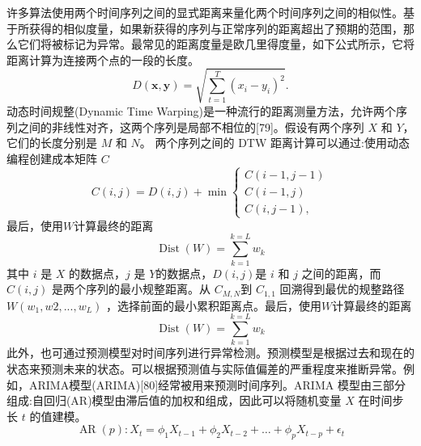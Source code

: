 许多算法使用两个时间序列之间的显式距离来量化两个时间序列之间的相似性。基于所获得的相似度量，如果新获得的序列与正常序列的距离超出了预期的范围，那么它们将被标记为异常。最常见的距离度量是欧几里得度量，如下公式所示，它将距离计算为连接两个点的一段的长度。
\begin{equation}
    D(\mathbf{x}, \mathbf{y})=\sqrt{\sum_{t=1}^T\left(x_i-y_i\right)^2} .
    \end{equation}
动态时间规整(Dynamic Time Warping)是一种流行的距离测量方法，允许两个序列之间的非线性对齐，这两个序列是局部不相位的[79]。假设有两个序列 $X$ 和 $Y$，它们的长度分别是 $M$ 和 $N$。   
两个序列之间的 DTW 距离计算可以通过:使用动态编程创建成本矩阵 $C$
    \begin{equation}
        C(i, j)=D(i, j)+\min \left\{\begin{array}{l}
        C(i-1, j-1) \\
        C(i-1, j) \\
        C(i, j-1),
        \end{array}\right.
        \end{equation}
    最后，使用$W$计算最终的距离
\begin{equation}
    \operatorname{Dist}(W)=\sum_{k=1}^{k=L} w_k
    \end{equation}
    其中 $i$ 是 $X$ 的数据点，$j$ 是 $Y$的数据点，$D(i, j)$是 $i$ 和 $j$ 之间的距离，而 $C(i, j)$ 是两个序列的最小规整距离。从 $C_{M, N}$到 $C_{1,1}$ 回溯得到最优的规整路径 $W(w_1, w2, ... , w_L)$ ，选择前面的最小累积距离点。最后，使用$W$计算最终的距离
    \begin{equation}
        \operatorname{Dist}(W)=\sum_{k=1}^{k=L} w_k
        \end{equation}
此外，也可通过预测模型对时间序列进行异常检测。预测模型是根据过去和现在的状态来预测未来的状态。可以根据预测值与实际值偏差的严重程度来推断异常。例如，ARIMA模型(ARIMA)[80]经常被用来预测时间序列。ARIMA 模型由三部分组成:自回归(AR)模型由滞后值的加权和组成，因此可以将随机变量 $X$ 在时间步长 $t$ 的值建模。
    \begin{equation}
        \operatorname{AR}(p): X_t=\phi_1 X_{t-1}+\phi_2 X_{t-2}+\ldots+\phi_p X_{t-p}+\epsilon_t    
    \end{equation}
